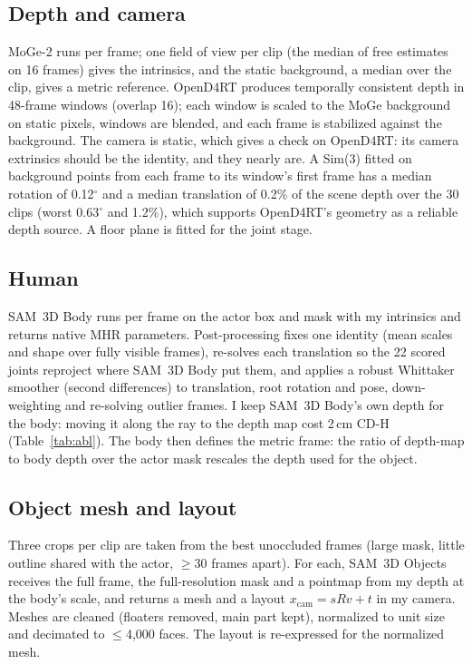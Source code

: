 \documentclass[10pt,twocolumn]{article}
\begin{document}
\subsection{Depth and camera}
MoGe-2 runs per frame; one field of view per clip (the median of free estimates on 16 frames) gives the
intrinsics, and the static background, a median over the clip, gives a metric reference. OpenD4RT produces
temporally consistent depth in 48-frame windows (overlap 16); each window is scaled to the MoGe background on
static pixels, windows are blended, and each frame is stabilized against the background. The camera is static, which
gives a check on OpenD4RT: its camera extrinsics should be the identity, and they nearly are. A Sim(3) fitted on
background points from each frame to its window's first frame has a median rotation of 0.12$^\circ$ and a median
translation of 0.2\% of the scene depth over the 30 clips (worst 0.63$^\circ$ and 1.2\%), which supports
OpenD4RT's geometry as a reliable depth source. A floor plane is fitted
for the joint stage.

\subsection{Human}
SAM~3D Body runs per frame on the actor box and mask with my intrinsics and returns native MHR parameters.
Post-processing fixes one identity (mean scales and shape over fully visible frames), re-solves each translation so the
22 scored joints reproject where SAM~3D Body put them, and applies a robust Whittaker smoother (second differences)
to translation, root rotation and pose, down-weighting and re-solving outlier frames. I keep SAM~3D Body's own
depth for the body: moving it along the ray to the depth map cost 2\,cm CD-H (Table~\ref{tab:abl}). The body then
defines the metric frame: the ratio of depth-map to body depth over the actor mask rescales the depth used for
the object.

\subsection{Object mesh and layout}
Three crops per clip are taken from the best unoccluded frames (large mask, little outline shared with the actor,
$\ge$30 frames apart). For each, SAM~3D Objects receives the full frame, the full-resolution mask and a pointmap
from my depth at the body's scale, and returns a mesh and a layout $x_\text{cam} = s R v + t$ in my camera.
Meshes are cleaned (floaters removed, main part kept), normalized to unit size and decimated to $\le$4{,}000 faces.
The layout is re-expressed for the normalized mesh.
\end{document}
